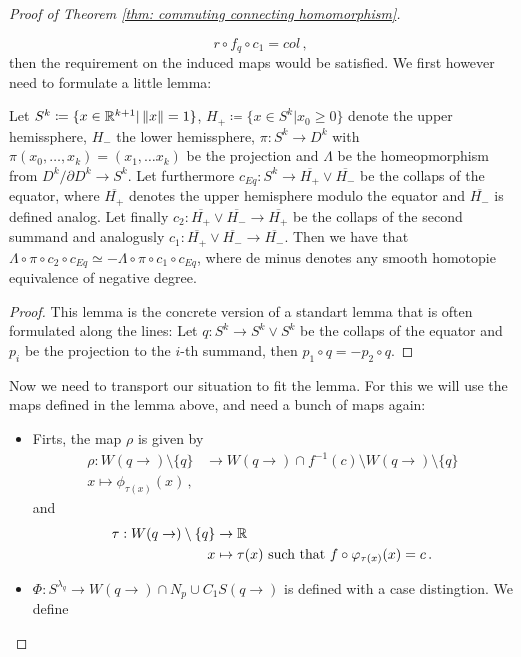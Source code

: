 \begin{proof}[Proof of Theorem \ref{thm: commuting connecting homomorphism}]
\begin{itemize}
			\begin{equation*}
				r\circ f_q\circ c_1=col\,, 
			\end{equation*}then the requirement on the induced maps would be satisfied. We first however need to formulate a little lemma:
			\begin{lemma}
				Let $S^k\coloneq \{x\in \mathbb{R}^{k+1}|\left\lVert x\right\rVert=1\}$, $H_+\coloneq\{x\in S^k|x_0\geq 0\}$ denote the upper hemissphere, $H_-$ the lower hemissphere,  $\pi:S^k \to D^k$ with $\pi(x_0,\dots,x_{k})=(x_1,\dots x_k)$ be the projection and $\Lambda$ be the homeopmorphism from $D^k\big/\partial D^k \to S^k$. Let furthermore $c_{Eq}:S^k\to \overline{H_+}\vee \overline{H_-}$ be the collaps of the equator, where $\overline{H_+}$ denotes the upper hemisphere modulo the equator and $\overline{H_-}$ is defined analog. Let finally $c_2: \overline{H_+}\vee \overline{H_-} \to \overline{H_+}$ be the collaps of the second summand and analogusly $c_1:  \overline{H_+}\vee \overline{H_-} \to \overline{H_-}$. Then we have that $\Lambda\circ \pi\circ c_2\circ c_{Eq}\simeq -\Lambda\circ \pi\circ c_1\circ c_{Eq}$, where de minus denotes any smooth homotopie equivalence of negative degree. 
			\end{lemma}
			\begin{proof}
				This lemma is the concrete version of a standart lemma that is often formulated along the lines: Let $q:S^k\to S^k\vee S^k$ be the collaps of the equator and $p_i$ be the projection to the $i$-th summand, then $p_1\circ q=-p_2\circ q$.  
			\end{proof}
			Now we need to transport our situation to fit the lemma. For this we will use the maps defined in the lemma above, and need a bunch of maps again: 
			\begin{itemize}
				\item Firts, the map $\rho$ is given by 
				\begin{align*}
					\rho: W(q\to)\setminus \{q\}&\to W(q\to)\cap f^{-1}(c)\setminus W(q\to)\setminus \{q\}\\
					x\mapsto \phi_{\tau(x)}(x)\,,
				\end{align*} and 
				\begin{align*}
					\tau: W(q\to)\setminus \{q\} &\to \mathbb{R}\\
					x                  &\mapsto \tau(x) \text{ such that }f\circ \varphi_{\tau(x)}(x) =c \, .
				\end{align*}
				\item $\Phi:S^{\lambda_q}\to W(q\to) \cap N_p\cup C_1S(q\to)$ is defined with a case distingtion. We define 

\end{itemize}
\end{itemize}
\end{proof}

